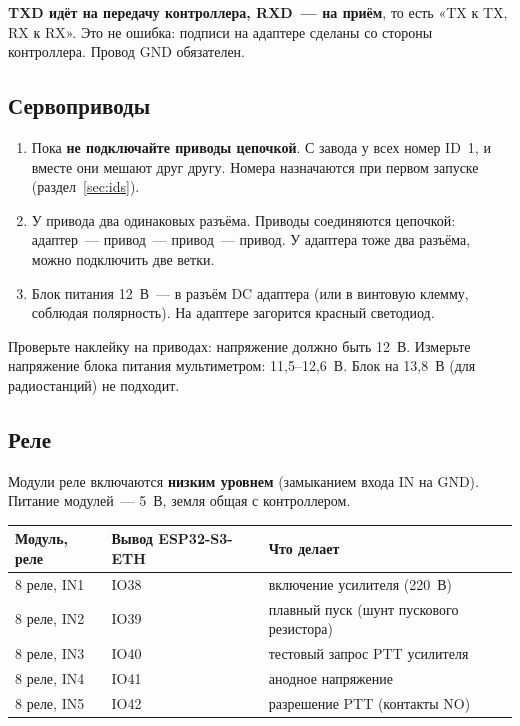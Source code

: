 \documentclass[a4paper,11pt]{article}
\begin{document}
\begin{attention}
\textbf{TXD идёт на передачу контроллера, RXD~— на приём}, то есть «TX к TX, RX к RX». Это не ошибка:
подписи на адаптере сделаны со стороны контроллера. Провод GND обязателен.
\end{attention}

\subsection{Сервоприводы}

\begin{enumerate}
  \item Пока \textbf{не подключайте приводы цепочкой}. С завода у всех номер ID~1, и вместе они
        мешают друг другу. Номера назначаются при первом запуске (раздел~\ref{sec:ids}).
  \item У привода два одинаковых разъёма. Приводы соединяются цепочкой: адаптер~— привод~— привод~— привод.
        У адаптера тоже два разъёма, можно подключить две ветки.
  \item Блок питания 12~В~— в разъём DC адаптера (или в винтовую клемму, соблюдая полярность).
        На адаптере загорится красный светодиод.
\end{enumerate}

\begin{verify}
Проверьте наклейку на приводах: напряжение должно быть 12~В. Измерьте напряжение блока питания
мультиметром: 11,5--12,6~В. Блок на 13,8~В (для радиостанций) не подходит.
\end{verify}

\subsection{Реле}

Модули реле включаются \textbf{низким уровнем} (замыканием входа IN на GND). Питание модулей~— 5~В,
земля общая с контроллером.

\begin{center}
\begin{tabular}{@{}lll@{}}
\toprule
\textbf{Модуль, реле} & \textbf{Вывод ESP32-S3-ETH} & \textbf{Что делает} \\
\midrule
8 реле, IN1 & IO38 & включение усилителя (220~В) \\
8 реле, IN2 & IO39 & плавный пуск (шунт пускового резистора) \\
8 реле, IN3 & IO40 & тестовый запрос PTT усилителя \\
8 реле, IN4 & IO41 & анодное напряжение \\
8 реле, IN5 & IO42 & разрешение PTT (контакты NO) \\
\bottomrule
\end{tabular}
\end{center}
\end{document}
